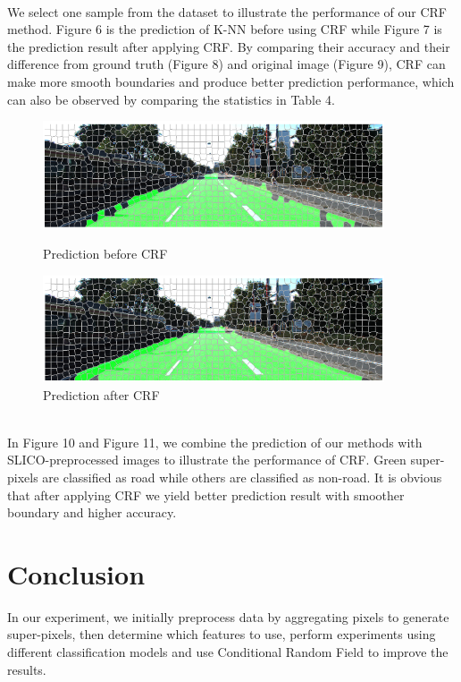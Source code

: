 \documentclass{article} %
\begin{document}
\\
We select one sample from the dataset to illustrate the performance of our CRF method. Figure 6 is the prediction of K-NN before using CRF while Figure 7 is the prediction result after applying CRF. By comparing their accuracy and their difference from ground truth (Figure 8) and original image (Figure 9), CRF can make more smooth boundaries and produce better prediction performance, which can also be observed by comparing the statistics in Table 4.\\
\begin{figure}[htbp]
\centering
\begin{minipage}{2.65in}
\centering
\includegraphics[width=0.9\textwidth]{10.png}
\caption{Prediction before CRF}
\end{minipage}
\begin{minipage}{2.65in}
\centering
\includegraphics[width=0.9\textwidth]{11.png}
\caption{Prediction after CRF}
\end{minipage}
\end{figure}
\\
In Figure 10 and Figure 11, we combine the prediction of our methods with SLICO-preprocessed images to illustrate the performance of CRF. Green super-pixels are classified as road while others are classified as non-road. It is obvious that after applying CRF we yield better prediction result with smoother boundary and higher accuracy.

\section{Conclusion}
In our experiment, we initially preprocess data by aggregating pixels to generate super-pixels, then determine which features to use, perform experiments using different classification models and use Conditional Random Field to improve the results. 
\end{document}
